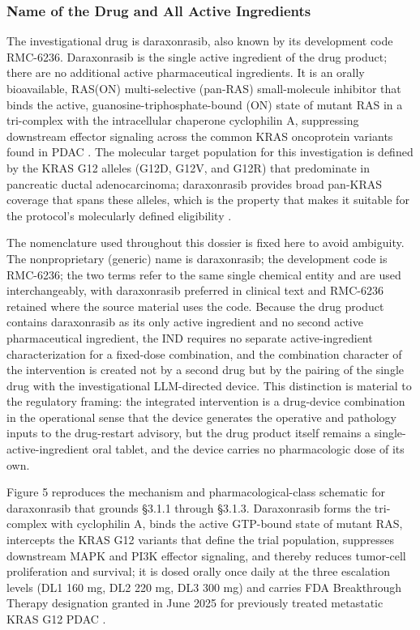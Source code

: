 \subsubsection{Name of the Drug and All Active Ingredients}

The investigational drug is daraxonrasib, also known by its development code
RMC-6236. Daraxonrasib is the single active ingredient of the drug product; there
are no additional active pharmaceutical ingredients. It is an orally bioavailable,
RAS(ON) multi-selective (pan-RAS) small-molecule inhibitor that binds the active,
guanosine-triphosphate-bound (ON) state of mutant RAS in a tri-complex with the
intracellular chaperone cyclophilin A, suppressing downstream effector signaling
across the common KRAS oncoprotein variants found in PDAC \cite{daraxwhipple,
onpremwhippl}. The molecular target population for this investigation is defined by
the KRAS G12 alleles (G12D, G12V, and G12R) that predominate in pancreatic ductal
adenocarcinoma; daraxonrasib provides broad pan-KRAS coverage that spans these
alleles, which is the property that makes it suitable for the protocol's
molecularly defined eligibility \cite{daraxwhipple}.

The nomenclature used throughout this dossier is fixed here to avoid ambiguity. The
nonproprietary (generic) name is daraxonrasib; the development code is RMC-6236; the
two terms refer to the same single chemical entity and are used interchangeably,
with daraxonrasib preferred in clinical text and RMC-6236 retained where the source
material uses the code. Because the drug product contains daraxonrasib as its only
active ingredient and no second active pharmaceutical ingredient, the IND requires
no separate active-ingredient characterization for a fixed-dose combination, and the
combination character of the intervention is created not by a second drug but by the
pairing of the single drug with the investigational LLM-directed device. This
distinction is material to the regulatory framing: the integrated intervention is a
drug-device combination in the operational sense that the device generates the
operative and pathology inputs to the drug-restart advisory, but the drug product
itself remains a single-active-ingredient oral tablet, and the device carries no
pharmacologic dose of its own.

Figure 5 reproduces the mechanism and pharmacological-class schematic for
daraxonrasib that grounds \S 3.1.1 through \S 3.1.3. Daraxonrasib forms the
tri-complex with cyclophilin A, binds the active GTP-bound state of mutant RAS,
intercepts the KRAS G12 variants that define the trial population, suppresses
downstream MAPK and PI3K effector signaling, and thereby reduces tumor-cell
proliferation and survival; it is dosed orally once daily at the three escalation
levels (DL1 160 mg, DL2 220 mg, DL3 300 mg) and carries FDA Breakthrough Therapy
designation granted in June 2025 for previously treated metastatic KRAS G12 PDAC
\cite{daraxwhipple, onpremwhippl}.

